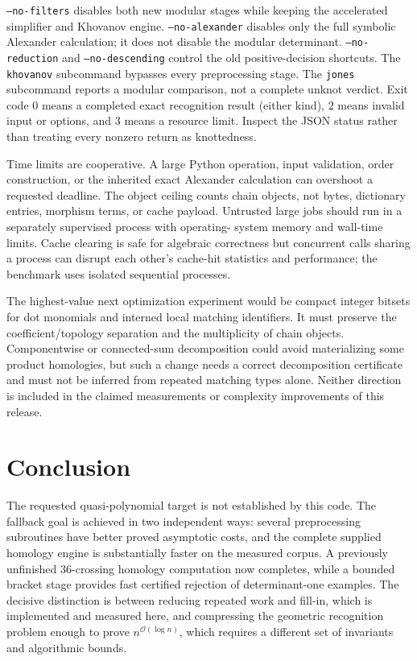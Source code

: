 \documentclass[11pt]{article}
\theoremstyle{remark}\newtheorem{remark}[theorem]{Remark}
\newcommand{\OO}{\mathcal O}
\newcommand{\code}[1]{\texttt{\small #1}}
\begin{document}
\code{--no-filters} disables both new modular stages while keeping the
accelerated simplifier and Khovanov engine. \code{--no-alexander} disables
only the full symbolic Alexander calculation; it does not disable the
modular determinant. \code{--no-reduction} and \code{--no-descending}
control the old positive-decision shortcuts. The \code{khovanov} subcommand
bypasses every preprocessing stage. The \code{jones} subcommand reports a
modular comparison, not a complete unknot verdict. Exit code $0$ means a
completed exact recognition result (either kind), $2$ means invalid input
or options, and $3$ means a resource limit. Inspect the JSON status rather
than treating every nonzero return as knottedness.

Time limits are cooperative. A large Python operation, input validation,
order construction, or the inherited exact Alexander calculation can
overshoot a requested deadline. The object ceiling counts chain objects,
not bytes, dictionary entries, morphism terms, or cache payload. Untrusted
large jobs should run in a separately supervised process with operating-
system memory and wall-time limits. Cache clearing is safe for algebraic
correctness but concurrent calls sharing a process can disrupt each
other's cache-hit statistics and performance; the benchmark uses isolated
sequential processes.

The highest-value next optimization experiment would be compact integer
bitsets for dot monomials and interned local matching identifiers. It must
preserve the coefficient/topology separation and the multiplicity of chain
objects. Componentwise or connected-sum decomposition could avoid materializing
some product homologies, but such a change needs a correct decomposition
certificate and must not be inferred from repeated matching types alone.
Neither direction is included in the claimed measurements or complexity
improvements of this release.

\section{Conclusion}

The requested quasi-polynomial target is not established by this code.
The fallback goal is achieved in two independent ways: several preprocessing
subroutines have better proved asymptotic costs, and the complete supplied
homology engine is substantially faster on the measured corpus. A previously
unfinished $36$-crossing homology computation now completes, while a bounded
bracket stage provides fast certified rejection of determinant-one examples.
The decisive distinction is between reducing repeated work and fill-in,
which is implemented and measured here, and compressing the geometric
recognition problem enough to prove $n^{\OO(\log n)}$, which requires a
different set of invariants and algorithmic bounds.
\end{document}
